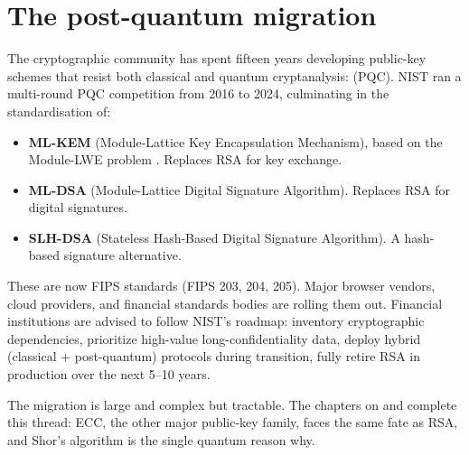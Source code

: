 \section{The post-quantum migration}

The cryptographic community has spent fifteen years developing public-key schemes that resist both classical and quantum cryptanalysis:  (PQC). NIST ran a multi-round PQC competition from 2016 to 2024, culminating in the standardisation of:

\begin{itemize}
  \item \textbf{ML-KEM} (Module-Lattice Key Encapsulation Mechanism), based on the Module-LWE problem \citep{nist_fips203_2024}. Replaces RSA for key exchange.
  \item \textbf{ML-DSA} (Module-Lattice Digital Signature Algorithm). Replaces RSA for digital signatures.
  \item \textbf{SLH-DSA} (Stateless Hash-Based Digital Signature Algorithm). A hash-based signature alternative.
\end{itemize}

These are now FIPS standards (FIPS 203, 204, 205). Major browser vendors, cloud providers, and financial standards bodies are rolling them out. Financial institutions are advised to follow NIST's roadmap: inventory cryptographic dependencies, prioritize high-value long-confidentiality data, deploy hybrid (classical + post-quantum) protocols during transition, fully retire RSA in production over the next 5--10 years.

The migration is large and complex but tractable. The chapters on  and  complete this thread: ECC, the other major public-key family, faces the same fate as RSA, and Shor's algorithm is the single quantum reason why.

\textsep
